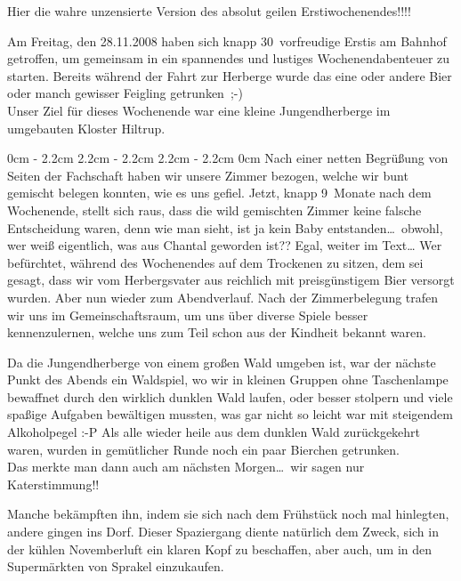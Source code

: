 \begin{multicols}{2}
Hier die wahre unzensierte Version des absolut geilen Erstiwochenendes!!!!

Am Freitag, den 28.11.2008 haben sich knapp 30~vorfreudige Erstis am Bahnhof getroffen, um gemeinsam in ein spannendes und lustiges Wochenendabenteuer zu starten. Bereits während der Fahrt zur Herberge wurde das eine oder andere Bier oder manch gewisser Feigling getrunken~;-)\\
Unser Ziel für dieses Wochenende war eine kleine Jungendherberge im umgebauten Kloster Hiltrup.

0cm \columnwidth
0cm \columnwidth
0cm \columnwidth
0cm \columnwidth
0cm \columnwidth
0cm \columnwidth
0cm \columnwidth
0cm \columnwidth
0cm \columnwidth
0cm \columnwidth
0cm \columnwidth
0cm \columnwidth
2.2cm \dimexpr\columnwidth - 2.2cm
2.2cm \dimexpr\columnwidth - 2.2cm
2.2cm \dimexpr\columnwidth - 2.2cm
0cm \columnwidth
Nach einer netten Begrüßung von Seiten der Fachschaft haben wir unsere Zimmer bezogen, welche wir bunt gemischt belegen konnten, wie es uns gefiel. Jetzt, knapp 9~Monate nach dem Wochenende, stellt sich raus, dass die wild gemischten Zimmer keine falsche Entscheidung waren, denn wie man sieht, ist ja kein Baby entstanden\dots\ obwohl, wer weiß eigentlich, was aus Chantal geworden ist?? Egal, weiter im Text{\dots} Wer befürchtet, während des Wochenendes auf dem Trockenen zu sitzen, dem sei gesagt, dass wir vom Herbergsvater aus reichlich mit preisgünstigem Bier versorgt wurden. Aber nun wieder zum Abendverlauf. Nach der Zimmerbelegung trafen wir uns im Gemeinschaftsraum, um uns über diverse Spiele besser kennenzulernen, welche uns zum Teil schon aus der Kindheit bekannt waren.

Da die Jungendherberge von einem großen Wald umgeben ist, war der nächste Punkt des Abends ein Waldspiel, wo wir in kleinen Gruppen ohne Taschenlampe bewaffnet durch den wirklich dunklen Wald laufen, oder besser stolpern und viele spaßige Aufgaben bewältigen mussten, was gar nicht so leicht war mit steigendem Alkoholpegel :-P Als alle wieder heile aus dem dunklen Wald zurückgekehrt waren, wurden in gemütlicher Runde noch ein paar Bierchen getrunken.\\
Das merkte man dann auch am nächsten Morgen\dots\ wir sagen nur Katerstimmung!!

\begin{center}
\end{center}

Manche bekämpften ihn, indem sie sich nach dem Frühstück noch mal hinlegten, andere gingen ins Dorf. Dieser Spaziergang diente natürlich dem Zweck, sich in der kühlen Novemberluft ein klaren Kopf zu beschaffen, aber auch, um in den Supermärkten von Sprakel einzukaufen.


\end{multicols}
